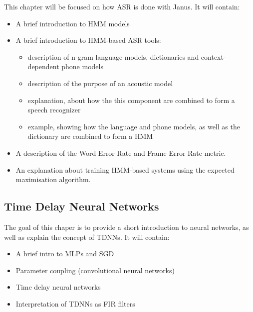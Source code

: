 This chapter will be focused on how ASR is done with Janus. It will contain: 
\begin{itemize}
	\item A brief introduction to HMM models
	\item A brief introduction to HMM-based ASR tools:
	\begin{itemize}
		\item description of n-gram language models, dictionaries and context-dependent phone models
		\item description of the purpose of an acoustic model
		\item explanation, about how the this component are combined to form a speech recognizer 
		\item example, showing how the language and phone models, as well as the dictionary are combined to form a HMM
	\end{itemize}
	\item A description of the Word-Error-Rate and Frame-Error-Rate metric. 
	\item An explanation about training HMM-based systems using the expected maximisation algorithm. 
\end{itemize}

\subsection{Time Delay Neural Networks}
\label{ch:TDNN}
The goal of this chaper is to provide a short introduction to neural networks, 
as well as explain the concept of TDNNs. It will contain:
\begin{itemize}
	\item A brief intro to MLPs and SGD
	\item Parameter coupling (convolutional neural networks)
	\item Time delay neural networks
	\item Interpretation of TDNNs as FIR filters
\end{itemize}

